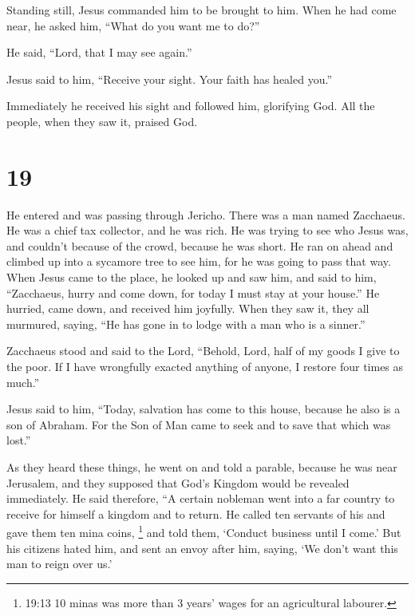  Standing still, Jesus commanded him to be brought to him.
When he had come near, he asked him,  ``What do you want me
to do?''

He said, ``Lord, that I may see again.''

 Jesus said to him, ``Receive your sight. Your faith has
healed you.''

 Immediately he received his sight and followed him,
glorifying God. All the people, when they saw it, praised God.

\hypertarget{section-18}{%
\section{19}\label{section-18}}

 He entered and was passing through Jericho. 
There was a man named Zacchaeus. He was a chief tax collector, and he
was rich.  He was trying to see who Jesus was, and couldn't
because of the crowd, because he was short.  He ran on ahead
and climbed up into a sycamore tree to see him, for he was going to pass
that way.  When Jesus came to the place, he looked up and
saw him, and said to him, ``Zacchaeus, hurry and come down, for today I
must stay at your house.''  He hurried, came down, and
received him joyfully.  When they saw it, they all murmured,
saying, ``He has gone in to lodge with a man who is a sinner.''

 Zacchaeus stood and said to the Lord, ``Behold, Lord, half
of my goods I give to the poor. If I have wrongfully exacted anything of
anyone, I restore four times as much.''

 Jesus said to him, ``Today, salvation has come to this
house, because he also is a son of Abraham.  For the Son of
Man came to seek and to save that which was lost.''

 As they heard these things, he went on and told a parable,
because he was near Jerusalem, and they supposed that God's Kingdom
would be revealed immediately.  He said therefore, ``A
certain nobleman went into a far country to receive for himself a
kingdom and to return.  He called ten servants of his and
gave them ten mina coins, \footnote{19:13 10 minas was more than 3
  years' wages for an agricultural labourer.} and told them, `Conduct
business until I come.'  But his citizens hated him, and
sent an envoy after him, saying, `We don't want this man to reign over
us.'

